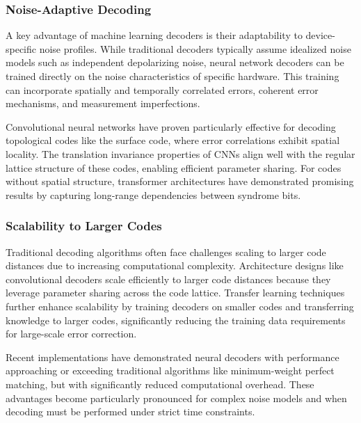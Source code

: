 \subsubsection{Noise-Adaptive Decoding}

A key advantage of machine learning decoders is their adaptability to device-specific noise profiles. While traditional decoders typically assume idealized noise models such as independent depolarizing noise, neural network decoders can be trained directly on the noise characteristics of specific hardware. This training can incorporate spatially and temporally correlated errors, coherent error mechanisms, and measurement imperfections.

Convolutional neural networks have proven particularly effective for decoding topological codes like the surface code, where error correlations exhibit spatial locality. The translation invariance properties of CNNs align well with the regular lattice structure of these codes, enabling efficient parameter sharing. For codes without spatial structure, transformer architectures have demonstrated promising results by capturing long-range dependencies between syndrome bits.

\subsubsection{Scalability to Larger Codes}

Traditional decoding algorithms often face challenges scaling to larger code distances due to increasing computational complexity. Architecture designs like convolutional decoders scale efficiently to larger code distances because they leverage parameter sharing across the code lattice. Transfer learning techniques further enhance scalability by training decoders on smaller codes and transferring knowledge to larger codes, significantly reducing the training data requirements for large-scale error correction.

Recent implementations have demonstrated neural decoders with performance approaching or exceeding traditional algorithms like minimum-weight perfect matching, but with significantly reduced computational overhead. These advantages become particularly pronounced for complex noise models and when decoding must be performed under strict time constraints.

